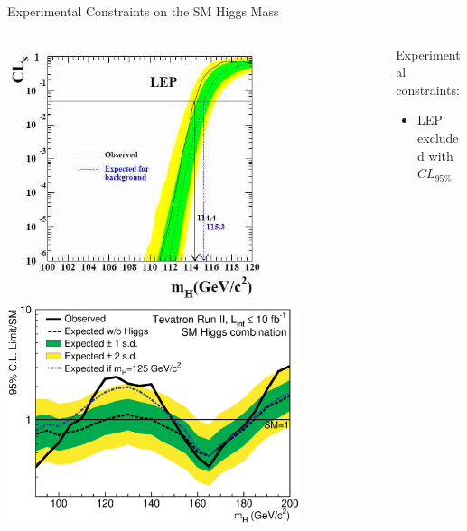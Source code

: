 \begin{frame}{Experimental Constraints on the SM Higgs Mass}

\begin{center}

\begin{columns}
      \begin{column}{0.5\textwidth}
        \begin{center}
\includegraphics[width=0.69\textwidth]{images/lep2limit.jpg}\\
\includegraphics[width=0.79\textwidth]{images/tevsmlimits_feb2013.eps}
\end{center}
\end{column}
\begin{column}{0.5\textwidth}
Experimental constraints:
\begin{itemize}
\item
  LEP excluded with $CL_{95\%}$\\

\end{itemize}
\end{column}
\end{columns}
\end{center}
\end{frame}
